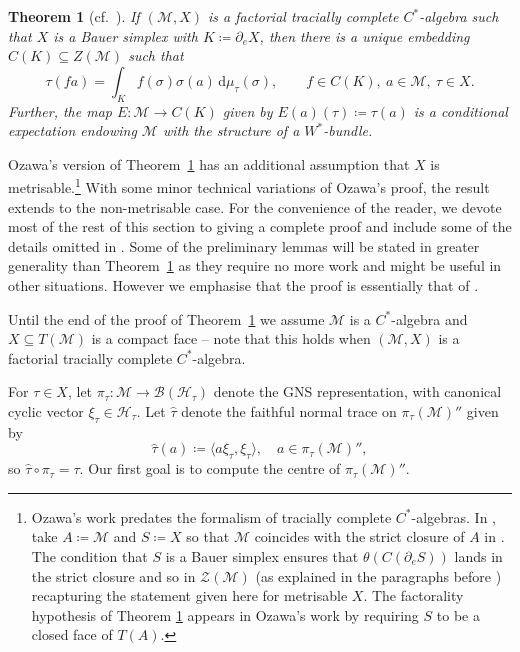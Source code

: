 \documentclass[a4paper,11pt]{amsart}
\newtheorem{theorem}{Theorem}
\theoremstyle{definition}
\numberwithin{equation}{section}
\numberwithin{theorem}{section}
\begin{document}
\begin{theorem}[{cf.\ \cite[Theorem 3]{Oz13}}]\label{thm:TCtoWStarBundle}
	If $(\mathcal M, X)$ is a factorial tracially complete $C^*$-algebra such that $X$ is a Bauer simplex with $K \coloneqq \partial_e X$, then there is a unique embedding $C(K) \subseteq Z(\mathcal M)$ such that
	\begin{equation}\label{eq:central-embedding}
		\tau(fa) = \int_K f(\sigma)\sigma(a) \, \mathrm{d} \mu_\tau(\sigma), \qquad f \in C(K),\ a \in \mathcal M,\ \tau \in X.
	\end{equation}
 	 Further, the map $E \colon \mathcal M \rightarrow C(K)$ given by $E(a)(\tau) \coloneqq \tau(a)$ is a conditional expectation endowing $\mathcal M$ with the structure of a $W^*$-bundle.
\end{theorem}

Ozawa's version of Theorem~\ref{thm:TCtoWStarBundle} has an additional assumption that $X$ is metrisable.\footnote{Ozawa's work predates the formalism of tracially complete $C^*$-algebras. In \cite[Theorem 3]{Oz13}, take $A\coloneqq \mathcal{M}$ and $S\coloneqq X$ so that $\mathcal M$ coincides with the strict closure of $A$ in \cite[Theorem 3]{Oz13}. The condition that $S$ is a Bauer simplex ensures that $\theta(C(\partial_e S))$ lands in the strict closure and so in $\mathcal Z(\mathcal M)$ (as explained in the paragraphs before \cite[Theorem 3]{Oz13}) recapturing the statement given here for metrisable $X$. The factorality hypothesis of Theorem \ref{thm:TCtoWStarBundle} appears in Ozawa's work by requiring $S$ to be a closed face of $T(A)$.}  With some minor technical variations of Ozawa's proof, the result extends to the non-metrisable case.  For the convenience of the reader, we devote most of the rest of this section to giving a complete proof and include some of the details omitted in \cite{Oz13}.   Some of the preliminary lemmas will be stated in greater generality than Theorem~\ref{thm:TCtoWStarBundle} as they require no more work and might be useful in other situations. However we emphasise that the proof is essentially that of \cite{Oz13}.

Until the end of the proof of Theorem~\ref{thm:TCtoWStarBundle} we assume $\mathcal M$ is a $C^*$-algebra and $X \subseteq T(\mathcal M)$ is a compact face -- note that this holds when $(\mathcal M, X)$ is a factorial tracially complete $C^*$-algebra.  

For $\tau \in X$, let $\pi_\tau \colon \mathcal M \rightarrow \mathcal B(\mathcal H_\tau)$ denote the GNS representation, with canonical cyclic vector $\xi_\tau \in \mathcal H_\tau$.  Let $\hat \tau$ denote the faithful normal trace on $\pi_\tau(\mathcal M)''$ given by 
\begin{equation}
\label{eq:hattau-def}
\hat \tau(a) \coloneqq \langle a \xi_\tau, \xi_\tau \rangle,\quad a\in \pi_\tau(\mathcal M)'',
\end{equation}
so $\hat \tau \circ \pi_\tau = \tau$.  Our first goal is to compute the centre of $\pi_\tau(\mathcal M)''$.
\end{document}
